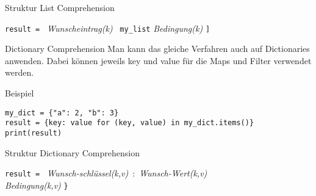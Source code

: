 \begin{frame}


\begin{block}{Struktur List Comprehension}	
\vspace{2pt}

\texttt{result = }
\pause {\Large\texttt{[}}
\pause\textit{Wunscheintrag(k)} \,
\pause {} 
\pause {} 
\pause {} 
\pause \texttt{my\_list} 
\pause {} 
\pause \textit{Bedingung(k)}
\pause \Large{\texttt{]}}

\end{block}

\end{frame}



\begin{fragile}

\begin{block}{Dictionary Comprehension}
\vspace{2pt}
Man kann das gleiche Verfahren auch auf Dictionaries anwenden. Dabei können jeweils key und value für die Maps und Filter verwendet werden. 
\end{block}

\vspace{12pt}

\begin{exampleblock}{Beispiel}
\vspace{2pt}
\begin{verbatim}
my_dict = {"a": 2, "b": 3}
result = {key: value for (key, value) in my_dict.items()}
print(result)
\end{verbatim}
\end{exampleblock}

\end{fragile}

\begin{frame}
\begin{block}{Struktur Dictionary Comprehension}	
\vspace{2pt}

\texttt{result = }
\pause {\Large\texttt{\{}}
\pause\textit{Wunsch-schlüssel(k,v)} 
\pause \,:\,
\pause  \textit{Wunsch-Wert(k,v)}  \\
\phantom{result = Klammer  }
\pause {} 
\pause {} 
\pause {} 
\pause {} 
\pause {} 
\pause \textit{Bedingung(k,v)}
\pause \Large{\texttt{\}}}

\end{block}

\end{frame}



